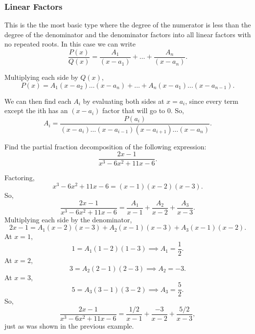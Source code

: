 \subsubsection{Linear Factors}
\noindent
This is the the most basic type where the degree of the numerator is less than the degree of the denominator and the denominator factors into all linear factors with no repeated roots. In this case we can write
\begin{equation*}
	\frac{P(x)}{Q(x)} = \frac{A_1}{(x-a_1)} + \ldots + \frac{A_n}{(x-a_n)}.
\end{equation*}

\noindent
Multiplying each side by $Q(x)$,
\begin{equation*}
	P(x) = A_1(x-a_2) \ldots (x-a_n) + \ldots + A_n(x-a_1) \ldots (x-a_{n-1}).
\end{equation*}

\noindent
We can then find each $A_i$ by evaluating both sides at $x=a_i$, since every term except the ith has an $(x-a_i)$ factor that will go to 0. So,
\begin{equation*}
	A_i = \frac{P(a_i)}{(x-a_i) \ldots (x-a_{i-1})(x-a_{i+1}) \ldots (x-a_n)}.
\end{equation*}

\begin{example}
	Find the partial fraction decomposition of the following expression:
	\begin{equation*}
		\frac{2x-1}{x^3-6x^2+11x-6}.
	\end{equation*}
\end{example}
\noindent
Factoring,
\begin{equation*}
	x^3 - 6x^2 + 11x - 6 = (x-1)(x-2)(x-3).
\end{equation*}
So,
\begin{equation*}
	\frac{2x-1}{x^3-6x^2+11x-6} = \frac{A_1}{x-1}+\frac{A_2}{x-2}+\frac{A_3}{x-3}.
\end{equation*}
Multiplying each side by the denominator,
\begin{equation*}
	2x-1 = A_1(x-2)(x-3)+A_2(x-1)(x-3)+A_3(x-1)(x-2).
\end{equation*}
At $x=1$,
\begin{equation*}
	1 = A_1(1-2)(1-3) \implies A_1 = \frac{1}{2}.
\end{equation*}
At $x=2$,
\begin{equation*}
	3 = A_2(2-1)(2-3) \implies A_2 = -3.
\end{equation*}
At $x=3$,
\begin{equation*}
	5 = A_3(3-1)(3-2) \implies A_3 = \frac{5}{2}.
\end{equation*}
So,
\begin{equation*}
	\frac{2x-1}{x^3-6x^2+11x-6} = \frac{1/2}{x-1} + \frac{-3}{x-2} + \frac{5/2}{x-3},
\end{equation*}
just as was shown in the previous example.